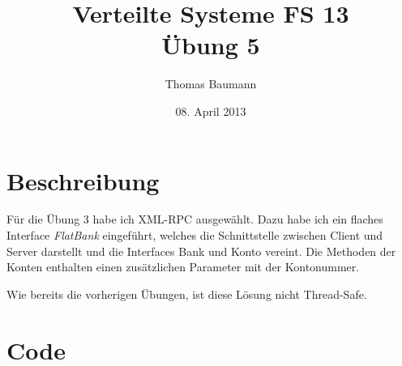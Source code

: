 \documentclass[10pt]{article}
\title{
	\vspace{5cm}
	Verteilte Systeme FS 13\\
	Übung 5
}
\author{Thomas Baumann}
\date{08. April 2013}
\newcommand{\Kursiv}[1]{\textit{#1}} %
\let\stdsection\section{}
\renewcommand{\section}{\newpage\stdsection}
\begin{document}
\maketitle
\thispagestyle{fancy}

\newpage



\newpage
\setcounter{page}{1}

\section{Beschreibung}
Für die Übung 3 habe ich XML-RPC ausgewählt. Dazu habe ich ein flaches Interface 
\Kursiv{FlatBank} eingeführt, welches die Schnittstelle zwischen Client und Server 
darstellt und die Interfaces Bank und Konto vereint. Die Methoden der Konten enthalten 
einen zusätzlichen Parameter mit der Kontonummer. 

Wie bereits die vorherigen Übungen, ist diese Lösung nicht Thread-Safe.

\section{Code}





\end{document}

